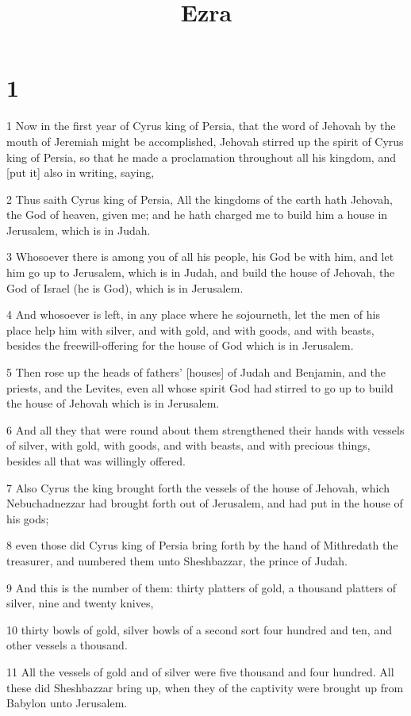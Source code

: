 

\title{Ezra}

\chapter{1}

\par 1 Now in the first year of Cyrus king of Persia, that the word of Jehovah by the mouth of Jeremiah might be accomplished, Jehovah stirred up the spirit of Cyrus king of Persia, so that he made a proclamation throughout all his kingdom, and [put it] also in writing, saying,
\par 2 Thus saith Cyrus king of Persia, All the kingdoms of the earth hath Jehovah, the God of heaven, given me; and he hath charged me to build him a house in Jerusalem, which is in Judah.
\par 3 Whosoever there is among you of all his people, his God be with him, and let him go up to Jerusalem, which is in Judah, and build the house of Jehovah, the God of Israel (he is God), which is in Jerusalem.
\par 4 And whosoever is left, in any place where he sojourneth, let the men of his place help him with silver, and with gold, and with goods, and with beasts, besides the freewill-offering for the house of God which is in Jerusalem.
\par 5 Then rose up the heads of fathers' [houses] of Judah and Benjamin, and the priests, and the Levites, even all whose spirit God had stirred to go up to build the house of Jehovah which is in Jerusalem.
\par 6 And all they that were round about them strengthened their hands with vessels of silver, with gold, with goods, and with beasts, and with precious things, besides all that was willingly offered.
\par 7 Also Cyrus the king brought forth the vessels of the house of Jehovah, which Nebuchadnezzar had brought forth out of Jerusalem, and had put in the house of his gods;
\par 8 even those did Cyrus king of Persia bring forth by the hand of Mithredath the treasurer, and numbered them unto Sheshbazzar, the prince of Judah.
\par 9 And this is the number of them: thirty platters of gold, a thousand platters of silver, nine and twenty knives,
\par 10 thirty bowls of gold, silver bowls of a second sort four hundred and ten, and other vessels a thousand.
\par 11 All the vessels of gold and of silver were five thousand and four hundred. All these did Sheshbazzar bring up, when they of the captivity were brought up from Babylon unto Jerusalem.

